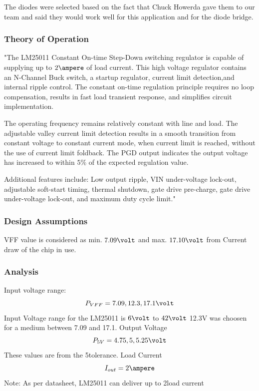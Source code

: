 The diodes were selected based on the fact that Chuck Howerda gave them to our team and said they would work well for this application and for the diode bridge.

 

\subsubsection{Theory of Operation}
"The LM25011 Constant On-time Step-Down switching regulator is capable of supplying up to $2\ampere$ of load current. This high voltage regulator contains an N-Channel Buck switch, a startup regulator, current limit detection,and internal ripple control. The constant on-time regulation principle requires no loop compensation, results in fast load transient response, and simplifies circuit implementation.


The operating frequency remains relatively constant with line and load. The adjustable valley current limit detection results in a smooth transition from constant voltage to constant current mode, when current limit is reached, without the use of current limit foldback. The PGD output indicates the output voltage has increased to within $5\percent$ of the expected regulation value.

Additional features include: Low output ripple, VIN under-voltage lock-out, adjustable soft-start timing, thermal shutdown, gate drive pre-charge, gate drive under-voltage lock-out, and maximum duty cycle limit."\cite{LM25011}
\subsubsection{Design Assumptions}
 VFF value is considered as min. $7.09\volt$ and max. $17.10\volt$ from Current draw of the chip in use.
\subsubsection{Analysis}
\begin{outline}[enumerate]
\1 Input voltage range:
\begin{equation}
P_{VFF}=7.09, 12.3, 17.1 \volt
\end{equation}
\2 Input Voltage range for the LM25011 is $6\volt$ to $42\volt$ 12.3V was choosen for a medium between 7.09 and 17.1.
\1 Output Voltage
\begin{equation}
P_{5V}=4.75, 5, 5.25 \volt
\end{equation}
\2 These values are from the 5\percent tolerance. 
\1 Load Current
\begin{equation}
I_{out}=2\ampere
\end{equation}
\2 Note: As per datasheet, LM25011 can deliver up to 2\ampere load current
\end{outline}


